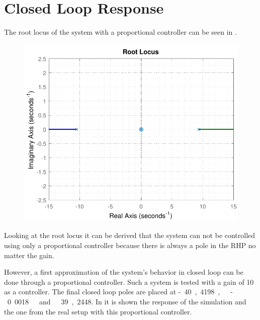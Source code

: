 \section{Closed Loop Response}\label{closedLoop}

The root locus of the system with a proportional controller can be seen in .

\begin{figure}[H]
	\centering 
	\includegraphics[scale=.5]{figures/rlocusCubli}
	\label{rlocusCubli2}
\end{figure}

Looking at the root locus it can be derived that the system can not be controlled using only a proportional controller because there is always a pole in the RHP no matter the gain.

However, a first approximation of the system's behavior in closed loop can be done through a proportional controller. Such a system is tested with a gain of 10 as a controller. The final closed loop poles are placed at \si{-40,4198,\ -0.0018\ and\ 39,2448}. In  it is shown the response of the simulation and the one from the real setup with this proportional controller.

